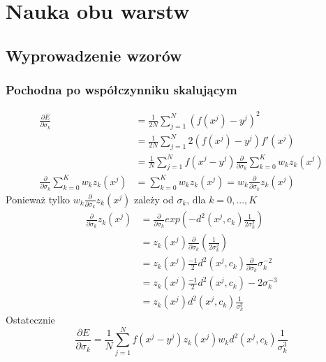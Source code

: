 \documentclass[a4paper, portrait,11pt]{article}
\begin{document}
\section{Nauka obu warstw}
\newcommand{\partialSigma}{\frac{\partial}{\partial{\sigma_{k}}}}

\subsection{Wyprowadzenie wzorów}
\subsubsection{Pochodna po współczynniku skalującym}
\begin{align*}
  \frac{\partial E}{\partial{\sigma_{k}}}&= \frac{1}{2N} \sum_{j=1}^{N} (f(x^j) - y^j)^2\\
  &= \frac{1}{2N} \sum_{j=1}^{N} 2 (f(x^j) - y^j) f'(x^j)\\
  &= \frac{1}{N} \sum_{j=1}^{N} f(x^j - y^j) \partialSigma \sum_{k=0}^{K} w_k z_k(x^j)\\
  \partialSigma \sum_{k=0}^{K} w_k z_k(x^j) &= \sum_{k=0}^{K} w_k z_k(x^j) =  w_k \frac{\partial}{\partial{\sigma_{k}}}z_k(x^j)
\end{align*}
Ponieważ tylko $w_k \partialSigma z_k(x^j)$ zależy od $\sigma_k$, dla $k=0, ..., K$
\begin{align*}
  \frac{\partial}{\partial{\sigma_{k}}}z_k(x^j) &= \partialSigma exp(-d^2(x^j, c_k) \frac{1}{2\sigma_k^2})\\
  &= z_k(x^j) \partialSigma ( \frac{1}{2\sigma_k^2}) \\
  &= z_k(x^j) \frac{-1}{2} d^2(x^j, c_k) \partialSigma {\sigma_k^{-2}}\\
  &= z_k(x^j) \frac{-1}{2} d^2(x^j, c_k) -2 \sigma_k^{-3}\\
  &= z_k(x^j) d^2(x^j, c_k) \frac{1}{\sigma_k^3}
\end{align*}
Ostatecznie
\begin{equation}
  \frac{\partial E}{\partial{\sigma_{k}}} = \frac{1}{N} \sum_{j=1}^{N} f(x^j - y^j) z_k(x^j) w_k d^2(x^j, c_k) \frac{1}{\sigma_k^3}
\end{equation}
\end{document}
